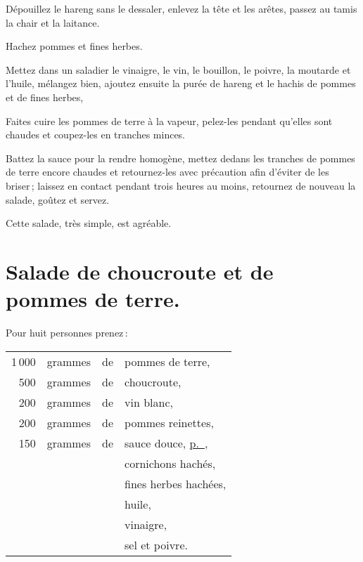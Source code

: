Dépouillez le hareng sans le dessaler, enlevez la tête et les arêtes, passez au
tamis la chair et la laitance.

Hachez pommes et fines herbes.

Mettez dans un saladier le vinaigre, le vin, le bouillon, le poivre, la moutarde
et l'huile, mélangez bien, ajoutez ensuite la purée de hareng et le hachis de pommes
et de fines herbes,

Faites cuire les pommes de terre à la vapeur, pelez-les pendant qu'elles sont
chaudes et coupez-les en tranches minces.

Battez la sauce pour la rendre homogène, mettez dedans les tranches de pommes
de terre encore chaudes et retournez-les avec précaution afin d'éviter de les
briser ; laissez en contact pendant trois heures au moins, retournez de nouveau
la salade, goûtez et servez.

Cette salade, très simple, est agréable.

\section*{\centering Salade de choucroute et de pommes de terre.}
{}

Pour huit personnes prenez :

\footnotesize
\begin{longtable}{rrrp{16em}}
  1 000 & grammes & de & pommes de terre,                                                                 \\
    500 & grammes & de & choucroute,                                                                      \\
    200 & grammes & de & vin blanc,                                                                       \\
    200 & grammes & de & pommes reinettes,                                                                \\
    150 & grammes & de & sauce douce, \hyperlink{p0415}{p. \pageref{pg0415}},                             \\
        &         &    & cornichons hachés,                                                               \\
        &         &    & fines herbes hachées,                                                            \\
        &         &    & huile,                                                                           \\
        &         &    & vinaigre,                                                                        \\
        &         &    & sel et poivre.                                                                   \\
\end{longtable}
\normalsize

